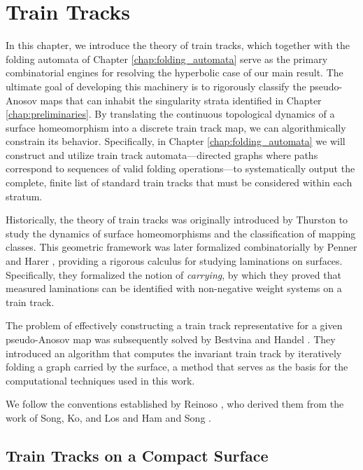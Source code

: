 \chapter{Train Tracks}
\label{chap:train tracks}

In this chapter, we introduce the theory of train tracks, which together with the folding automata of Chapter \ref{chap:folding_automata} serve as the primary combinatorial engines for resolving the hyperbolic case of our main result. The ultimate goal of developing this machinery is to rigorously classify the pseudo-Anosov maps that can inhabit the singularity strata identified in Chapter \ref{chap:preliminaries}. By translating the continuous topological dynamics of a surface homeomorphism into a discrete train track map, we can algorithmically constrain its behavior. Specifically, in Chapter \ref{chap:folding_automata} we will construct and utilize train track automata---directed graphs where paths correspond to sequences of valid folding operations---to systematically output the complete, finite list of standard train tracks that must be considered within each stratum.

Historically, the theory of train tracks was originally introduced by Thurston \cite{Thurston1988} to study the dynamics of surface homeomorphisms and the classification of mapping classes. This geometric framework was later formalized combinatorially by Penner and Harer \cite{penner1992combinatorics}, providing a rigorous calculus for studying laminations on surfaces. Specifically, they formalized the notion of \textit{carrying}, by which they proved that measured laminations can be identified with non-negative weight systems on a train track.

The problem of effectively constructing a train track representative for a given pseudo-Anosov map was subsequently solved by Bestvina and Handel \cite{bestvina1995train}. They introduced an algorithm that computes the invariant train track by iteratively folding a graph carried by the surface, a method that serves as the basis for the computational techniques used in this work.

We follow the conventions established by Reinoso \cite{reinoso2024pseudo}, who derived them from the work of Song, Ko, and Los \cite{SongEntropy} and Ham and Song \cite{HamSong2007}.

\section{Train Tracks on a Compact Surface}

